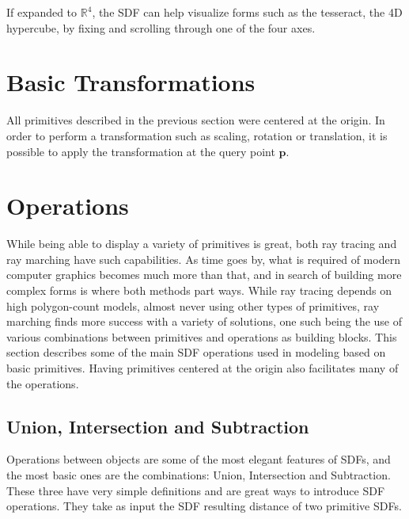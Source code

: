 If expanded to $\mathbb{R}^4 $, the SDF can help visualize forms such as the tesseract, the 4D hypercube, by fixing and scrolling through one of the four axes.

\section{Basic Transformations}

All primitives described in the previous section were centered at the origin. In order to perform a transformation such as scaling, rotation or translation, it is possible to apply the transformation at the query point $\mathbf{p}$.



\section{Operations}

While being able to display a variety of primitives is great, both ray tracing and ray marching have such capabilities. As time goes by, what is required of modern computer graphics becomes much more than that, and in search of building more complex forms is where both methods part ways. While ray tracing depends on high polygon-count models, almost never using other types of primitives, ray marching finds more success with a variety of solutions, one such being the use of various combinations between primitives and operations as building blocks.
This section describes some of the main SDF operations used in modeling based on basic primitives. Having primitives centered at the origin also facilitates many of the operations.

\subsection{Union, Intersection and Subtraction}

Operations between objects are some of the most elegant features of SDFs, and the most basic ones are the combinations: Union, Intersection and Subtraction. These three have very simple definitions and are great ways to introduce SDF operations. They take as input the SDF resulting distance of two primitive SDFs.


